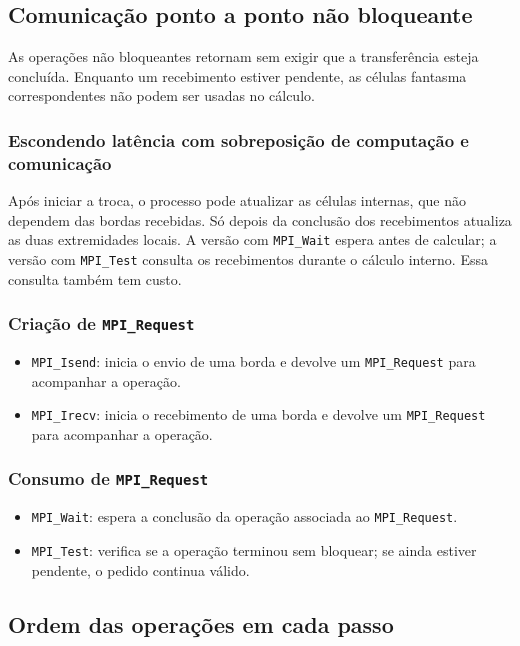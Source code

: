 \documentclass[11pt,letterpaper]{article}
\begin{document}
\subsection{Comunicação ponto a ponto não bloqueante}
As operações não bloqueantes retornam sem exigir que a transferência esteja concluída. Enquanto um recebimento estiver pendente, as células fantasma correspondentes não podem ser usadas no cálculo.

\subsubsection{Escondendo latência com sobreposição de computação e comunicação}
Após iniciar a troca, o processo pode atualizar as células internas, que não dependem das bordas recebidas. Só depois da conclusão dos recebimentos atualiza as duas extremidades locais. A versão com \texttt{MPI\_Wait} espera antes de calcular; a versão com \texttt{MPI\_Test} consulta os recebimentos durante o cálculo interno. Essa consulta também tem custo.

\subsubsection{Criação de \texttt{MPI\_Request}}
\begin{itemize}
\item \texttt{MPI\_Isend}: inicia o envio de uma borda e devolve um \texttt{MPI\_Request} para acompanhar a operação.
\item \texttt{MPI\_Irecv}: inicia o recebimento de uma borda e devolve um \texttt{MPI\_Request} para acompanhar a operação.
\end{itemize}

\subsubsection{Consumo de \texttt{MPI\_Request}}
\begin{itemize}
\item \texttt{MPI\_Wait}: espera a conclusão da operação associada ao \texttt{MPI\_Request}.
\item \texttt{MPI\_Test}: verifica se a operação terminou sem bloquear; se ainda estiver pendente, o pedido continua válido.
\end{itemize}

\subsection{Ordem das operações em cada passo}
\end{document}
